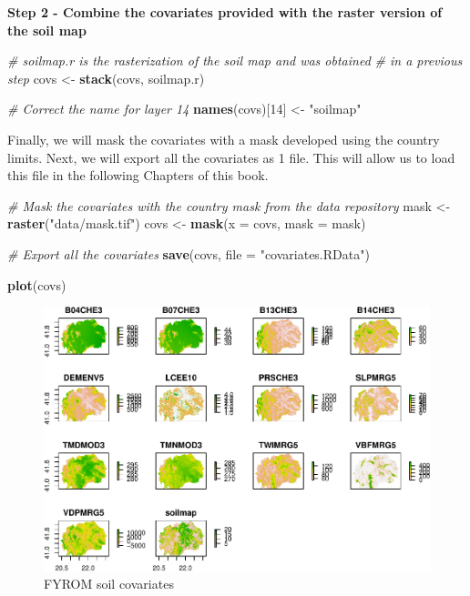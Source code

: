 \documentclass[10pt,b5paper,]{book}
\newenvironment{Shaded}{\begin{snugshade}}{\end{snugshade}}
\newcommand{\CommentTok}[1]{\textcolor[rgb]{0.56,0.35,0.01}{\textit{#1}}}
\newcommand{\DataTypeTok}[1]{\textcolor[rgb]{0.13,0.29,0.53}{#1}}
\newcommand{\DecValTok}[1]{\textcolor[rgb]{0.00,0.00,0.81}{#1}}
\newcommand{\KeywordTok}[1]{\textcolor[rgb]{0.13,0.29,0.53}{\textbf{#1}}}
\newcommand{\NormalTok}[1]{#1}
\newcommand{\StringTok}[1]{\textcolor[rgb]{0.31,0.60,0.02}{#1}}
\theoremstyle{definition}
\theoremstyle{definition}
\theoremstyle{definition}
\theoremstyle{remark}
\begin{document}
\textbf{Step 2 - Combine the covariates provided with the raster version
of the soil map}

\begin{Shaded}
\begin{Highlighting}[]
\CommentTok{# soilmap.r is the rasterization of the soil map and was obtained}
\CommentTok{# in a previous step}
\NormalTok{covs <-}\StringTok{ }\KeywordTok{stack}\NormalTok{(covs, soilmap.r)}

\CommentTok{# Correct the name for layer 14}
\KeywordTok{names}\NormalTok{(covs)[}\DecValTok{14}\NormalTok{] <-}\StringTok{ "soilmap"}
\end{Highlighting}
\end{Shaded}

Finally, we will mask the covariates with a mask developed using the
country limits. Next, we will export all the covariates as 1 file. This
will allow us to load this file in the following Chapters of this book.

\begin{Shaded}
\begin{Highlighting}[]
\CommentTok{# Mask the covariates with the country mask from the data repository}
\NormalTok{mask <-}\StringTok{ }\KeywordTok{raster}\NormalTok{(}\StringTok{"data/mask.tif"}\NormalTok{)}
\NormalTok{covs <-}\StringTok{ }\KeywordTok{mask}\NormalTok{(}\DataTypeTok{x =}\NormalTok{ covs, }\DataTypeTok{mask =}\NormalTok{ mask)}

\CommentTok{# Export all the covariates }
\KeywordTok{save}\NormalTok{(covs, }\DataTypeTok{file =} \StringTok{"covariates.RData"}\NormalTok{)}

\KeywordTok{plot}\NormalTok{(covs)}
\end{Highlighting}
\end{Shaded}

\begin{figure}
\centering
\includegraphics{SOCMapping_files/figure-latex/unnamed-chunk-26-1.pdf}
\caption{\label{fig:unnamed-chunk-26}FYROM soil covariates}
\end{figure}
\end{document}
